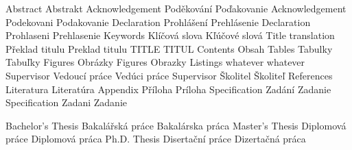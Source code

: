      {Abstract}          {Abstrakt}       {}
       {Acknowledgement}   {Poděkování}     {Poďakovanie} 
      {Acknowledgement}   {Podekovani}     {Podakovanie} 
  {Declaration}       {Prohlášení}     {Prehlásenie} 
 {Declaration}       {Prohlaseni}     {Prehlasenie}
     {Keywords}          {Klíčová slova}  {Kľúčové slová}
        {Title translation} {Překlad titulu} {Preklad titulu}
       {TITLE}             {TITUL}          {}
     {Contents}          {Obsah}          {}
       {Tables}            {Tabulky}        {Tabuľky}
      {Figures}           {Obrázky}        {}
     {Figures}           {Obrazky}        {}
     {Listings}          {whatever}       {whatever}
   {Supervisor}        {Vedoucí práce}  {Vedúci práce}
  {Supervisor}        {Školitel}       {Školiteľ}
 {References}        {Literatura}     {Literatúra}
     {Appendix}          {Příloha}        {Príloha}     
      {Specification}     {Zadání}         {Zadanie}
     {Specification}     {Zadani}         {Zadanie}

 {Bachelor's Thesis} {Bakalářská práce}  {Bakalárska práca}
 {Master's Thesis}   {Diplomová práce}   {Diplomová práca}
 {Ph.D. Thesis}      {Disertační práce}  {Dizertačná práca}

\def\keepacc#1{\slet{mt:#10:sk}{mt:#1:sk}\slet{mt:#10:\czs}{mt:#1:\czs}}
\def\keepaccents{\keepacc{thanks}%
  \keepacc{declaration}\keepacc{figures}\keepacc{specifi}}

\newcount\lnum
\def\thelnum{\thechapnum.\the\lnum}
\def\athelnum{.}


\def\worktype[#1/#2]{%
   \isdefined{wt:#1}\iftrue \csname wt:#1\endcsname \relax
      \else \ctustyleERR {Unknown \noexpand\worktype parameter}\fi
   \isdefined{wl:#2}\iftrue \csname wl:#2\endcsname \relax
      \else \ctustyleERR {Unknown \noexpand\worktype parameter}\fi
}


